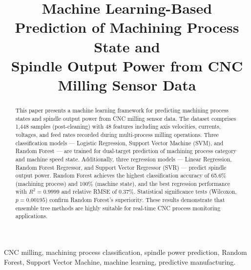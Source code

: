 \documentclass[conference]{IEEEtran}
\begin{document}
\title{Machine Learning-Based Prediction of Machining Process State and\\
Spindle Output Power from CNC Milling Sensor Data}

\author{
}

\maketitle

\begin{abstract}
This paper presents a machine learning framework for predicting machining process states
and spindle output power from CNC milling sensor data. The dataset comprises 1,448 samples
(post-cleaning) with 48 features including axis velocities, currents, voltages, and feed
rates recorded during multi-process milling operations. Three classification models —
Logistic Regression, Support Vector Machine (SVM), and Random Forest — are trained for
dual-target prediction of machining process category and machine speed state. Additionally,
three regression models — Linear Regression, Random Forest Regressor, and Support Vector
Regressor (SVR) — predict spindle output power. Random Forest achieves the highest
classification accuracy of 65.6\% (machining process) and 100\% (machine state), and
the best regression performance with $R^2 = 0.9999$ and relative RMSE of 0.37\%.
Statistical significance tests (Wilcoxon, $p = 0.00195$) confirm Random Forest's
superiority. These results demonstrate that ensemble tree methods are highly suitable for
real-time CNC process monitoring applications.
\end{abstract}

\begin{IEEEkeywords}
CNC milling, machining process classification, spindle power prediction, Random Forest,
Support Vector Machine, machine learning, predictive manufacturing.
\end{IEEEkeywords}

\end{document}
